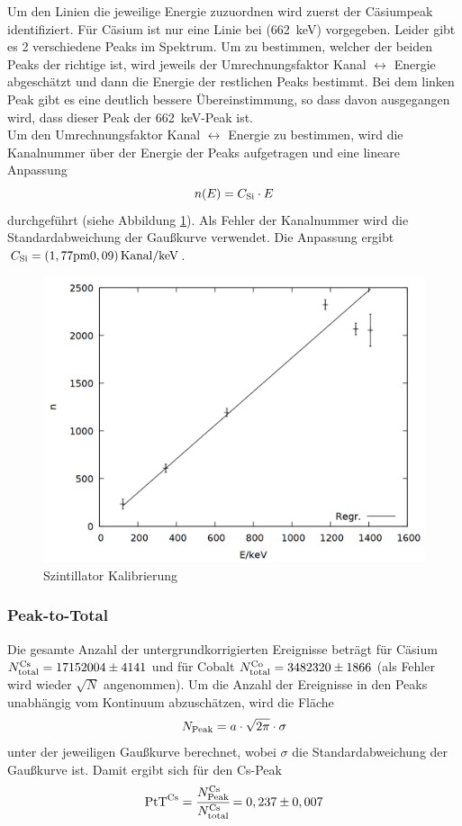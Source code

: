 Um den Linien die jeweilige Energie zuzuordnen wird zuerst der Cäsiumpeak identifiziert. Für Cäsium ist nur eine Linie bei (\SI{662}{keV}) vorgegeben. Leider gibt es 2 verschiedene Peaks im Spektrum. Um zu bestimmen, welcher der beiden Peaks der richtige ist, wird jeweils der Umrechnungsfaktor Kanal $\leftrightarrow$ Energie abgeschätzt und dann die Energie der restlichen Peaks bestimmt. Bei dem linken Peak gibt es eine deutlich bessere Übereinstimmung, so dass davon ausgegangen wird, dass dieser Peak der \SI{662}{keV}-Peak ist.\\

Um den Umrechnungsfaktor Kanal $\leftrightarrow$ Energie zu bestimmen, wird die Kanalnummer über der Energie der Peaks aufgetragen und eine lineare Anpassung \[n(E) = C\ind{Si}\cdot E\] durchgeführt (siehe Abbildung \ref{fig:si_gauge}). Als Fehler der Kanalnummer wird die Standardabweichung der Gaußkurve verwendet. Die Anpassung ergibt $C\ind{Si} = \si{(1,77\pm 0,09)\,Kanal/keV}$.

\begin{figure}[h]
\centering
\includegraphics[width=0.7\linewidth]{data/si_gauge.png}
\caption{Szintillator Kalibrierung}
\label{fig:si_gauge}
\end{figure}

\subsubsection*{Peak-to-Total}
Die gesamte Anzahl der untergrundkorrigierten Ereignisse beträgt für Cäsium $N\ind{total}\upd{Cs} = 17152004 \pm 4141$ und für Cobalt $N\ind{total}\upd{Co} = 3482320\pm 1866$ (als Fehler wird wieder $\sqrt{N}$ angenommen). Um die Anzahl der Ereignisse in den Peaks unabhängig vom Kontinuum abzuschätzen, wird die Fläche
\begin{align}
N\ind{Peak} = a\cdot\sqrt{2\pi}\cdot \sigma 
\label{eq:npeak}
\end{align}
 unter der jeweiligen Gaußkurve berechnet, wobei $\sigma$ die Standardabweichung der Gaußkurve ist.
Damit ergibt sich für den Cs-Peak
\begin{align*} 
\text{PtT}\upd{Cs} = \cfrac{N\ind{Peak}\upd{Cs}}{N\ind{total}\upd{Cs}} = 0,237\pm 0,007 
\end{align*}

